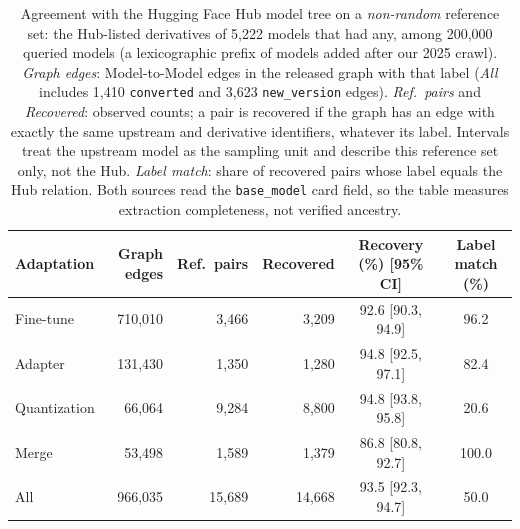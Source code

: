 \begin{table}[t]
\centering
\small
\caption{Agreement with the Hugging Face Hub model tree on a \emph{non-random} reference set: the Hub-listed derivatives of 5{,}222 models that had any, among 200{,}000 queried models (a lexicographic prefix of models added after our 2025 crawl).
\emph{Graph edges}: Model-to-Model edges in the released graph with that label (\emph{All} includes 1{,}410 \texttt{converted} and 3{,}623 \texttt{new\_version} edges).
\emph{Ref.\ pairs} and \emph{Recovered}: observed counts; a pair is recovered if the graph has an edge with exactly the same upstream and derivative identifiers, whatever its label.
Intervals treat the upstream model as the sampling unit and describe this reference set only, not the Hub.
\emph{Label match}: share of recovered pairs whose label equals the Hub relation.
Both sources read the \texttt{base\_model} card field, so the table measures extraction completeness, not verified ancestry.}
\label{tab:hub_agreement}
\begin{tabular}{lrrrcc}
\toprule
Adaptation & Graph edges & Ref.\ pairs & Recovered & Recovery (\%) [95\% CI] & Label match (\%) \\
\midrule
Fine-tune    & 710{,}010 &  3{,}466 &  3{,}209 & 92.6 [90.3, 94.9] &  96.2 \\
Adapter      & 131{,}430 &  1{,}350 &  1{,}280 & 94.8 [92.5, 97.1] &  82.4 \\
Quantization &  66{,}064 &  9{,}284 &  8{,}800 & 94.8 [93.8, 95.8] &  20.6 \\
Merge        &  53{,}498 &  1{,}589 &  1{,}379 & 86.8 [80.8, 92.7] & 100.0 \\
\midrule
All          & 966{,}035 & 15{,}689 & 14{,}668 & 93.5 [92.3, 94.7] &  50.0 \\
\bottomrule
\end{tabular}
\end{table}
